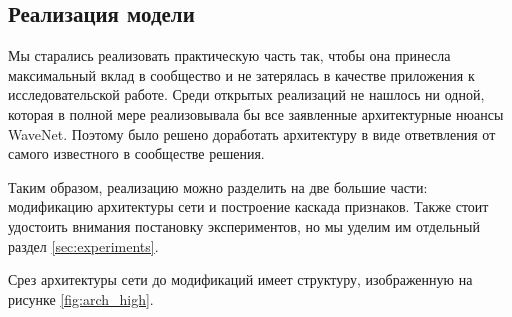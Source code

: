 \documentclass[../diploma.tex]{subfiles}
\begin{document}
\subsection{Реализация модели}

Мы старались реализовать практическую часть так, чтобы она принесла максимальный вклад в сообщество и не затерялась в качестве приложения к исследовательской работе. Среди открытых реализаций не нашлось ни одной, которая в полной мере реализовывала бы все заявленные архитектурные нюансы WaveNet. 
Поэтому было решено доработать архитектуру в виде ответвления от самого известного в сообществе решения.

Таким образом, реализацию можно разделить на две большие части: модификацию архитектуры сети и построение каскада признаков. 
Также стоит удостоить внимания постановку экспериментов, но мы уделим им отдельный раздел \ref{sec:experiments}.

Срез архитектуры сети до модификаций имеет структуру, изображенную на рисунке \ref{fig:arch_high}.
\end{document}
